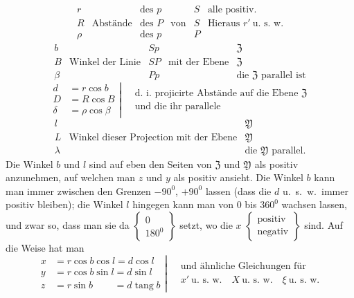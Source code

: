 %
\[
\begin{array}{c|c|c|c|c|l}
r&&\text{des }p&&S&\text{alle positiv.}\\
R&\text{Abstände}&\text{des }P&\text{von}&S&\text{Hieraus }r'\ \text{u.\ s.\ w.}\\
\rho&&\text{des }p&&P&
\end{array}
\]
\[
\begin{array}{c|c|c|c|l}
b&&Sp&&\mathfrak{Z}\\
B&\text{Winkel der Linie}&SP&\text{mit der Ebene}&\mathfrak{Z}\\
\beta&&Pp&&\text{die }\mathfrak{Z}\text{ parallel ist}
\end{array}
\]
\[
\left.\begin{aligned}
d&=r\cos b\\D&=R\cos B\\\delta&=\rho\cos\beta
\end{aligned}\right|\quad
\begin{gathered}\text{d.\ i.\ projicirte Abstände auf die Ebene }\mathfrak{Z}\\\text{und die ihr parallele}\end{gathered}
\]
\[
\begin{array}{c|c|l}
l&&\mathfrak{Y}\\
L&\text{Winkel dieser Projection mit der Ebene}&\mathfrak{Y}\\
\lambda&&\text{die }\mathfrak{Y}\text{ parallel.}
\end{array}
\]
Die Winkel $b$ und $l$ sind auf eben den Seiten von $\mathfrak{Z}$ und $\mathfrak{Y}$ als positiv anzunehmen, auf welchen man $z$ und $y$ als positiv ansieht. Die Winkel $b$ kann man immer zwischen den Grenzen $-90^0$, $+90^0$ lassen (dass die $d$ u.\ s.\ w.\ immer positiv bleiben); die Winkel $l$ hingegen kann man von $0$ bis $360^0$ wachsen lassen, und zwar so, dass man sie da $\left\{\begin{smallmatrix}0\\180^0\end{smallmatrix}\right\}$ setzt, wo die $x$ $\left\{\begin{smallmatrix}\text{positiv}\\\text{negativ}\end{smallmatrix}\right\}$ sind. Auf die Weise hat man
\[
\left.\begin{aligned}
x&=r\cos b\cos l=d\cos l\\
y&=r\cos b\sin l=d\sin l\\
z&=r\sin b\phantom{\cos l}=d\operatorname{tang}b
\end{aligned}\right|\quad
\begin{gathered}\text{und ähnliche Gleichungen für}\\x'\ \text{u.\ s.\ w.}\quad X\ \text{u.\ s.\ w.}\quad\xi\ \text{u.\ s.\ w.}\end{gathered}
\]


